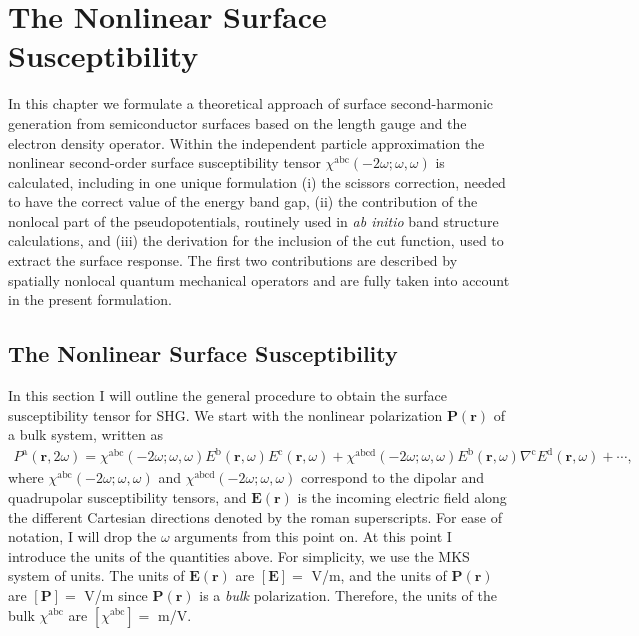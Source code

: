 \chapter{The Nonlinear Surface Susceptibility}\label{chap:chi2}
\partialtoc


In this chapter we formulate a theoretical approach of surface second-harmonic
generation from semiconductor surfaces based on the length gauge and the
electron density operator. Within the independent particle approximation the
nonlinear second-order surface susceptibility tensor
$\chi^{\mathrm{a}\mathrm{b}\mathrm{c}}(-2\omega;\omega,\omega)$ is calculated,
including in one unique formulation (i) the scissors correction, needed to have
the correct value of the energy band gap, (ii) the contribution of the nonlocal
part of the pseudopotentials, routinely  used in \textit{ab initio} band
structure calculations, and (iii) the derivation for the inclusion of the cut
function, used to extract the surface response. The first two contributions are
described by spatially nonlocal quantum mechanical operators and are fully taken
into account in the present formulation.



\section{The Nonlinear Surface Susceptibility}

In this section I will outline the general procedure to obtain the surface
susceptibility tensor for SHG. We start with the nonlinear polarization
$\mathbf{P}(\mathbf{r})$ of a bulk system, written as
\begin{equation}\label{mshg}
\begin{split}
P^{\mathrm{a}}(\mathbf{r},2\omega)
= \chi^{\mathrm{abc}}(-2\omega;\omega,\omega)
  E^{\mathrm{b}}(\mathbf{r},\omega)E^{\mathrm{c}}(\mathbf{r},\omega)
+ \chi^{\mathrm{abcd}}(-2\omega;\omega,\omega)
  E^{\mathrm{b}}(\mathbf{r},\omega)\nabla^{\mathrm{c}}
  E^{\mathrm{d}}(\mathbf{r},\omega)
+ \cdots,
\end{split}
\end{equation}
where $\chi^{\mathrm{abc}}(-2\omega;\omega,\omega)$ and
$\chi^{\mathrm{abcd}}(-2\omega;\omega,\omega)$ correspond to the dipolar and
quadrupolar susceptibility tensors, and $\mathbf{E}(\mathbf{r})$ is the incoming
electric field along the different Cartesian directions denoted by the roman
superscripts. For ease of notation, I will drop the $\omega$ arguments from this
point on. At this point I introduce the units of the quantities above. For
simplicity, we use the MKS system of units. The units of
$\mathbf{E}(\mathbf{r})$ are $[\mathbf{E}] = $ V/m, and the units of
$\mathbf{P}(\mathbf{r})$ are $[\mathbf{P}] = $ V/m since
$\mathbf{P}(\mathbf{r})$ is a \emph{bulk} polarization. Therefore, the units of
the bulk $\chi^{\mathrm{abc}}$ are $[\chi^{\mathrm{abc}}] = $ m/V.

